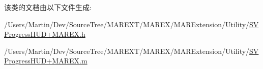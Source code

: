 该类的文档由以下文件生成\+:\begin{DoxyCompactItemize}
\item 
/\+Users/\+Martin/\+Dev/\+Source\+Tree/\+M\+A\+R\+E\+X\+T/\+M\+A\+R\+E\+X/\+M\+A\+R\+Extension/\+Utility/\hyperlink{_s_v_progress_h_u_d_09_m_a_r_e_x_8h}{S\+V\+Progress\+H\+U\+D+\+M\+A\+R\+E\+X.\+h}\item 
/\+Users/\+Martin/\+Dev/\+Source\+Tree/\+M\+A\+R\+E\+X\+T/\+M\+A\+R\+E\+X/\+M\+A\+R\+Extension/\+Utility/\hyperlink{_s_v_progress_h_u_d_09_m_a_r_e_x_8m}{S\+V\+Progress\+H\+U\+D+\+M\+A\+R\+E\+X.\+m}\end{DoxyCompactItemize}
